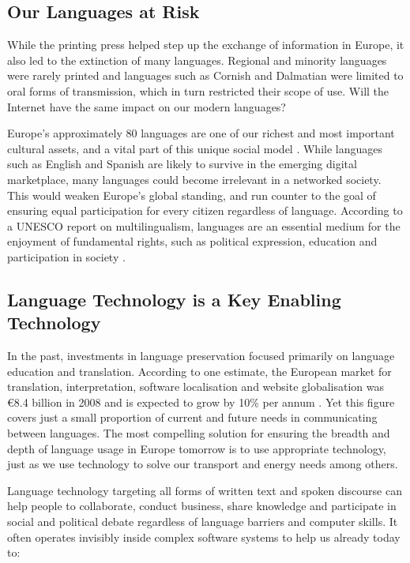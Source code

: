 \begin{multicols}{2}
\subsection{Our Languages at Risk}

While the printing press helped step up the exchange of information in Europe, it also led to the extinction of many languages. Regional and minority languages were rarely printed and languages such as Cornish and Dalmatian were limited to oral forms of transmission, which in turn restricted their scope of use. Will the Internet have the same impact on our modern languages?


Europe’s approximately 80 languages are one of our richest and most important cultural assets, and a vital part of this unique social model \cite{EC2}. While languages such as English and Spanish are likely to survive in the emerging digital marketplace, many languages could become irrelevant in a networked society. This would weaken Europe’s global standing, and run counter to the goal of ensuring equal participation for every citizen regardless of language. According to a UNESCO report on multilingualism, languages are an essential medium for the enjoyment of fundamental rights, such as political expression, education and participation in society \cite{Unesco1}.

\subsection{Language Technology is a Key Enabling Technology}

In the past, investments in language preservation focused primarily on language education and translation. According to one estimate, the European market for translation, interpretation, software localisation and website globalisation was €8.4 billion in 2008 and is expected to grow by 10\% per annum \cite{EC3}. Yet this figure covers just a small proportion of current and future needs in communicating between languages. The most compelling solution for ensuring the breadth and depth of language usage in Europe tomorrow is to use appropriate technology, just as we use technology to solve our transport and energy needs among others.

Language technology targeting all forms of written text and spoken discourse can help people to collaborate, conduct business, share knowledge and participate in social and political debate regardless of language barriers and computer skills. It often operates invisibly inside complex software systems to help us already today to:


\end{multicols}
